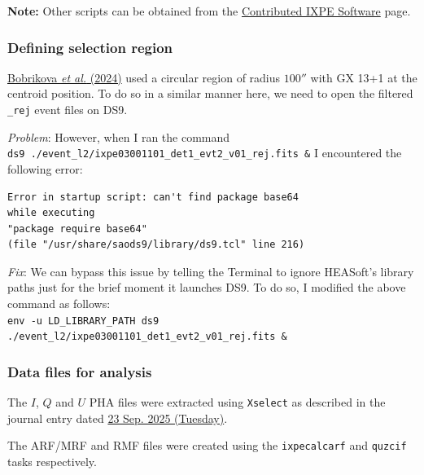 		\textbf{Note:} Other scripts can be obtained from the \href{https://heasarc.gsfc.nasa.gov/docs/ixpe/analysis/contributed.html}{Contributed IXPE Software} page.
		
	\subsubsection*{Defining selection region}
		\href{https://www.aanda.org/articles/aa/pdf/2024/08/aa50207-24.pdf}{Bobrikova \textit{et al.} (2024)} used a circular region of radius $100''$ with GX 13+1 at the centroid position. To do so in a similar manner here, we need to open the filtered \verb|_rej| event files on DS9.
		
		\textit{Problem}: However, when I ran the command\\
		\verb|ds9 ./event_l2/ixpe03001101_det1_evt2_v01_rej.fits &|
		I encountered the following error:
		\begin{verbatim}
Error in startup script: can't find package base64
while executing
"package require base64"
(file "/usr/share/saods9/library/ds9.tcl" line 216)
		\end{verbatim}
		\textit{Fix}: We can bypass this issue by telling the Terminal to ignore HEASoft's library paths just for the brief moment it launches DS9. To do so, I modified the above command as follows:\\
		\verb|env -u LD_LIBRARY_PATH ds9 ./event_l2/ixpe03001101_det1_evt2_v01_rej.fits &|
		
	\subsubsection*{Data files for analysis}
		The $I$, $Q$ and $U$ PHA files were extracted using \verb|Xselect| as described in the journal entry dated \hyperref[entry:20250923]{23 Sep. 2025 (Tuesday)}.
		
		The ARF/MRF and RMF files were created using the \verb|ixpecalcarf| and \verb|quzcif| tasks respectively.